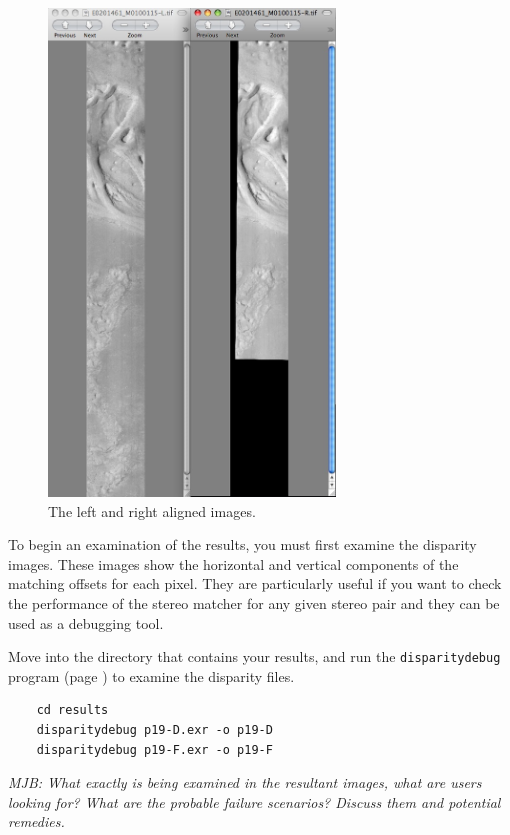 \begin{figure}
\begin{center}
\includegraphics[width=3in]{images/p19-aligned.png}
\caption[P19 aligned image]{
    \label{p19-aligned}
	The left and right aligned images.
    }
\end{center}
\end{figure}

To begin an examination of the results, you must first examine the
disparity images. These images show the horizontal and vertical
components of the matching offsets for each pixel. They are
particularly useful if you want to check the performance of the
stereo matcher for any given stereo pair and they can be used as a
debugging tool.

Move into the directory that contains your results, and run the
\texttt{disparitydebug} program (page \pageref{disparitydebug}) to
examine the disparity files.

\begin{verbatim}
    cd results
    disparitydebug p19-D.exr -o p19-D     
    disparitydebug p19-F.exr -o p19-F
\end{verbatim}

\emph{MJB: What exactly is being examined in the resultant images, what are users looking for?  What are the probable failure scenarios?  Discuss them and potential remedies.}


